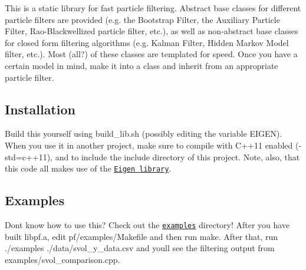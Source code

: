 \href{https://zenodo.org/badge/latestdoi/130237492}{\tt }

This is a static library for fast particle filtering. Abstract base classes for different particle filters are provided (e.\+g. the Bootstrap Filter, the Auxiliary Particle Filter, Rao-\/\+Blackwellized particle filter, etc.), as well as non-\/abstract base classes for closed form filtering algorithms (e.\+g. Kalman Filter, Hidden Markov Model filter, etc.). Most (all?) of these classes are templated for speed. Once you have a certain model in mind, make it into a class and inherit from an appropriate particle filter.

\subsection*{Installation}

Build this yourself using {\ttfamily build\+\_\+lib.\+sh} (possibly editing the variable {\ttfamily E\+I\+G\+EN}). When you use it in another project, make sure to compile with C++11 enabled ({\ttfamily -\/std=c++11}), and to include the {\ttfamily include} directory of this project. Note, also, that this code all makes use of the \href{http://eigen.tuxfamily.org/}{\tt Eigen library}.

\subsection*{Examples}

Don\textquotesingle{}t know how to use this? Check out the \href{https://github.com/tbrown122387/pf/tree/master/examples}{\tt {\ttfamily examples}} directory! After you have built {\ttfamily libpf.\+a}, edit {\ttfamily pf/examples/\+Makefile} and then run {\ttfamily make}. After that, run {\ttfamily ./examples ./data/svol\+\_\+y\+\_\+data.csv} and you\textquotesingle{}ll see the filtering output from {\ttfamily examples/svol\+\_\+comparison.\+cpp}. 